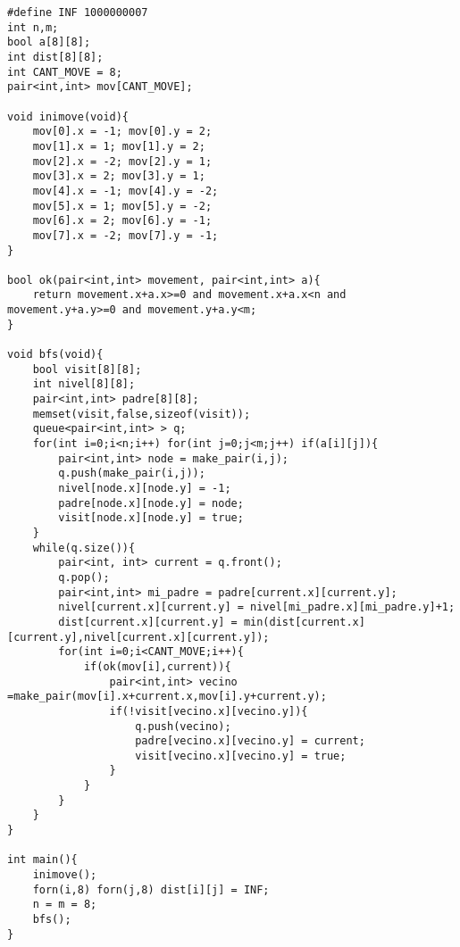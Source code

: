 \begin{verbatim}
#define INF 1000000007
int n,m;
bool a[8][8];
int dist[8][8];
int CANT_MOVE = 8;
pair<int,int> mov[CANT_MOVE];

void inimove(void){
    mov[0].x = -1; mov[0].y = 2;
    mov[1].x = 1; mov[1].y = 2;
    mov[2].x = -2; mov[2].y = 1;
    mov[3].x = 2; mov[3].y = 1;
    mov[4].x = -1; mov[4].y = -2;
    mov[5].x = 1; mov[5].y = -2;
    mov[6].x = 2; mov[6].y = -1;
    mov[7].x = -2; mov[7].y = -1;
}

bool ok(pair<int,int> movement, pair<int,int> a){
    return movement.x+a.x>=0 and movement.x+a.x<n and movement.y+a.y>=0 and movement.y+a.y<m;  
}

void bfs(void){
    bool visit[8][8];
    int nivel[8][8];
    pair<int,int> padre[8][8];
    memset(visit,false,sizeof(visit));
    queue<pair<int,int> > q;
    for(int i=0;i<n;i++) for(int j=0;j<m;j++) if(a[i][j]){
        pair<int,int> node = make_pair(i,j);
        q.push(make_pair(i,j));
        nivel[node.x][node.y] = -1;
        padre[node.x][node.y] = node;
        visit[node.x][node.y] = true;
    }
    while(q.size()){
        pair<int, int> current = q.front();
        q.pop();
        pair<int,int> mi_padre = padre[current.x][current.y];
        nivel[current.x][current.y] = nivel[mi_padre.x][mi_padre.y]+1;
        dist[current.x][current.y] = min(dist[current.x][current.y],nivel[current.x][current.y]);
        for(int i=0;i<CANT_MOVE;i++){
            if(ok(mov[i],current)){
                pair<int,int> vecino =make_pair(mov[i].x+current.x,mov[i].y+current.y);
                if(!visit[vecino.x][vecino.y]){
                    q.push(vecino);
                    padre[vecino.x][vecino.y] = current;
                    visit[vecino.x][vecino.y] = true;
                }
            }
        }  
    }
}

int main(){
    inimove();
    forn(i,8) forn(j,8) dist[i][j] = INF;
    n = m = 8;
    bfs();
}
\end{verbatim}